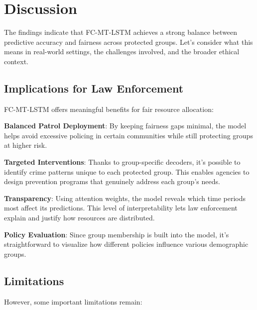 \documentclass[conference]{IEEEtran}
\begin{document}
\section{Discussion}

The findings indicate that FC-MT-LSTM achieves a strong balance between predictive accuracy and fairness across protected groups. Let's consider what this means in real-world settings, the challenges involved, and the broader ethical context.

\subsection{Implications for Law Enforcement}

FC-MT-LSTM offers meaningful benefits for fair resource allocation:

\textbf{Balanced Patrol Deployment}: By keeping fairness gaps minimal, the model helps avoid excessive policing in certain communities while still protecting groups at higher risk.

\textbf{Targeted Interventions}: Thanks to group-specific decoders, it's possible to identify crime patterns unique to each protected group. This enables agencies to design prevention programs that genuinely address each group's needs.

\textbf{Transparency}: Using attention weights, the model reveals which time periods most affect its predictions. This level of interpretability lets law enforcement explain and justify how resources are distributed.

\textbf{Policy Evaluation}: Since group membership is built into the model, it's straightforward to visualize how different policies influence various demographic groups.

\subsection{Limitations}

However, some important limitations remain:
\end{document}

